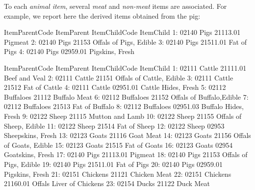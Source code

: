 \documentclass[nojss]{jss}
\begin{document}
To each \textit{animal item}, several \textit{meat} and \textit{non-meat} items are associated. For example, we report here the derived items obtained from the pig:

\begin{Schunk}
\begin{Soutput}
   ItemParentCode ItemParent ItemChildCode              ItemChild
1:          02140       Pigs      21113.01                Pigmeat
2:          02140       Pigs         21153 Offals of Pigs, Edible
3:          02140       Pigs      21511.01            Fat of Pigs
4:          02140       Pigs      02959.01        Pigskins, Fresh
\end{Soutput}
\begin{Soutput}
    ItemParentCode     ItemParent ItemChildCode                       ItemChild
 1:          02111         Cattle      21111.01                   Beef and Veal
 2:          02111         Cattle         21151        Offals of Cattle, Edible
 3:          02111         Cattle         21512                   Fat of Cattle
 4:          02111         Cattle      02951.01             Cattle Hides, Fresh
 5:          02112      Buffaloes         21112                    Buffalo Meat
 6:          02112      Buffaloes         21152        Offals of Buffalo,Edible
 7:          02112      Buffaloes         21513                  Fat of Buffalo
 8:          02112      Buffaloes      02951.03            Buffalo Hides, Fresh
 9:          02122          Sheep         21115                 Mutton and Lamb
10:          02122          Sheep         21155         Offals of Sheep, Edible
11:          02122          Sheep         21514                    Fat of Sheep
12:          02122          Sheep         02953               Sheepskins, Fresh
13:          02123          Goats         21116                       Goat Meat
14:          02123          Goats         21156         Offals of Goats, Edible
15:          02123          Goats         21515                    Fat of Goats
16:          02123          Goats         02954                Goatskins, Fresh
17:          02140           Pigs      21113.01                         Pigmeat
18:          02140           Pigs         21153          Offals of Pigs, Edible
19:          02140           Pigs      21511.01                     Fat of Pigs
20:          02140           Pigs      02959.01                 Pigskins, Fresh
21:          02151       Chickens         21121                    Chicken Meat
22:          02151       Chickens      21160.01        Offals Liver of Chickens
23:          02154          Ducks         21122                       Duck Meat

\end{Soutput}
\end{Schunk}
\end{document}
